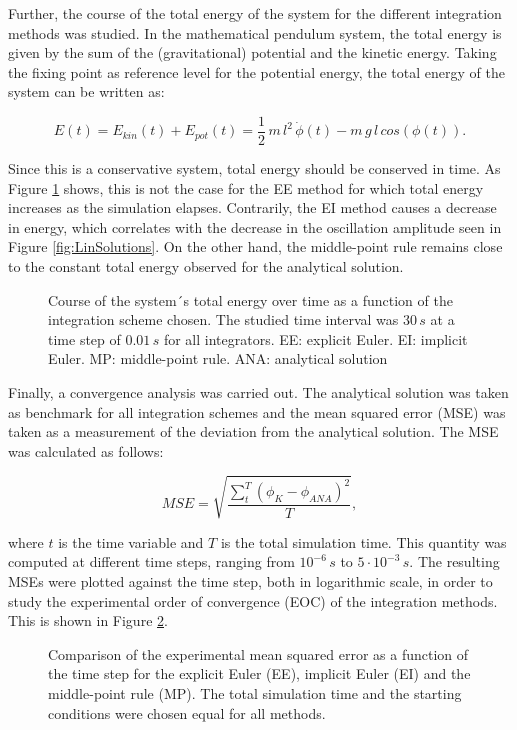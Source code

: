 \documentclass[12pt,bibstyle=none,pagenumberinfooter]{ifmdocument}
\begin{document}
Further, the course of the total energy of the system for the different integration methods was studied. In the mathematical pendulum system, the total energy is given by the sum of the (gravitational) potential and the kinetic energy. Taking the fixing point as reference level for the potential energy, the total energy of the system can be written as:

\begin{equation}
    E(t) = E_{kin}(t) + E_{pot}(t) = \frac{1}{2}\,m\,l^2\,\Dot{\phi}(t) - m\,g\,l\,cos\left(\phi(t)\right).
    \label{eq: energy}
\end{equation}

Since this is a conservative system, total energy should be conserved in time. As Figure \ref{fig: EnergyPlot} shows, this is not the case for the EE method for which total energy increases as the simulation elapses. Contrarily, the EI method causes a decrease in energy, which correlates with the decrease in the oscillation amplitude seen in Figure \ref{fig:LinSolutions}. On the other hand, the middle-point rule remains close to the constant total energy observed for the analytical solution.

\begin{figure}[h]
    \centering
    
    \caption{Course of the system´s total energy over time as a function of the integration scheme chosen. The studied time interval was $30\,s$ at a time step of $0.01\,s$ for all integrators. EE: explicit Euler. EI: implicit Euler. MP: middle-point rule. ANA: analytical solution}
    \label{fig: EnergyPlot}
\end{figure}

Finally, a convergence analysis was carried out. The analytical solution was taken as benchmark for all integration schemes and the mean squared error (MSE) was taken as a measurement of the deviation from the analytical solution. The MSE was calculated as follows:

\begin{equation}
    MSE = \sqrt{\frac{\displaystyle \sum_{t}^T \left(\phi_{K} - \phi_{ANA}\right)^2}{T}},
    \label{eq: MSE}
\end{equation}

where $t$ is the time variable and $T$ is the total simulation time. This quantity was computed at different time steps, ranging from $10^{-6} \, s$ to $5\cdot 10^{-3} \,s$. The resulting MSEs were plotted against the time step, both in logarithmic scale, in order to study the experimental order of convergence (EOC) of the integration methods. This is shown in Figure \ref{fig: ConvergencePlot}.


\begin{figure}[h]
    \centering
    
    \caption{Comparison  of the experimental mean squared error as a function of the time step for the explicit Euler (EE), implicit Euler (EI) and the middle-point rule (MP). The total simulation time and the starting conditions were chosen equal for all methods.}
    \label{fig: ConvergencePlot}
\end{figure}
\end{document}
